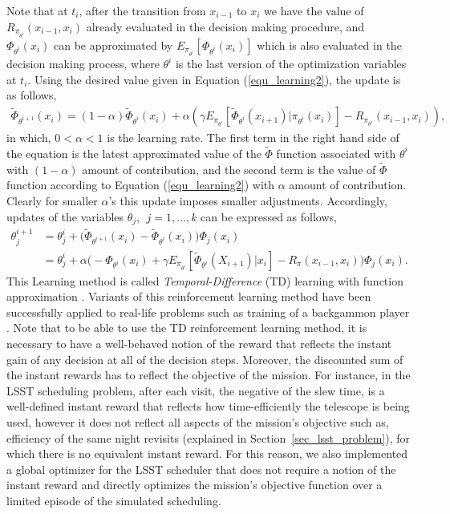 \documentclass[11pt]{article}
\theoremstyle{definition}
\begin{document}
Note that at $t_i$, after the transition from $x_{{i-1}}$ to $x_{{i}}$ we have the value of $R_{\pi_{\theta^i}}(x_{i-1},x_i) $ already evaluated in the decision making procedure, and  $\Phi_{\theta^i}(x_{i})$ can be approximated by $E_{\pi_{\theta^i}}[ \Phi_{\theta^i}(x_{i})]$ which is also evaluated in the decision making process, where $\theta^i$ is the last version of the optimization variables at $t_i$. Using the desired value given in Equation (\ref{equ_learning2}), the update is as follows,
\begin{equation}\label{equ_updatePHI}
\begin{aligned}
\tilde \Phi_{\theta^{i+1}}(x_{{i}}) = (1-\alpha) \tilde \Phi_{\theta^{i}}(x_{{i}})+ \alpha  ( \gamma  E_{\pi_{\theta^i}}[\tilde \Phi_{\theta^{i}}(x_{{i+1}})|\pi_{\theta^{i}}(x_{{i}})] -R_{\pi_{\theta^i}}(x_{i-1},x_i) ),
\end{aligned}
\end{equation}
in which, $0<\alpha<1$ is the learning rate. The first term in the right hand side of the equation is the latest approximated value of the $\tilde \Phi$ function associated with $\theta^i$ with $(1-\alpha)$ amount of contribution, and the second term is the value of $\tilde \Phi$ function according to Equation (\ref{equ_learning2}) with $\alpha$ amount of contribution. Clearly for smaller $\alpha$'s this update imposes smaller adjustments. Accordingly, updates of the variables $\theta_j,~~j=1,\dots, k$ can be expressed as follows,
\begin{equation} \label{equ_TD_update}
\begin{aligned}
\theta_j^{i+1} &= \theta_j^{i} + \Big( \tilde \Phi_{\theta^{i+1}}(x_{{i}})  - \tilde \Phi_{\theta^{i}}(x_{{i}}) \Big)\Phi_j(x_{i})\\
& = \theta_j^{i} + \alpha \Big(-\Phi_{\theta^{i}}(x_{{i}}) + \gamma  E_{\pi_{\theta^i}}[\tilde \Phi_{\theta^{i}}(X_{{i+1}})|x_{{i}}] -R_{\pi}(x_{i-1},x_i)  \Big)\Phi_j(x_{i}).
\end{aligned}
\end{equation}
This Learning method is called \textit{Temporal-Difference} (TD) learning with function approximation \cite{tsitsiklis1997analysis}. Variants of this reinforcement learning method have been successfully applied to real-life problems such as training of a backgammon player \cite{tesauro1995temporal}.
Note that to be able to use the TD reinforcement learning method, it is necessary to have a well-behaved notion of the reward that reflects the instant gain of any decision at all of the decision steps. Moreover, the discounted sum of the instant rewards has to reflect the objective of the mission. For instance, in the LSST scheduling problem, after each visit, the negative of the slew time, is a well-defined instant reward that reflects how time-efficiently the telescope is being used, however it does not reflect all aspects of the mission's objective such as, efficiency of the same night revisits (explained in Section~\ref{sec_lsst_problem}), for which there is no equivalent instant reward. For this reason, we also implemented a global optimizer for the LSST scheduler that does not require a notion of the instant reward and directly optimizes the mission's objective function over a limited  episode of the simulated scheduling. 
\end{document}
